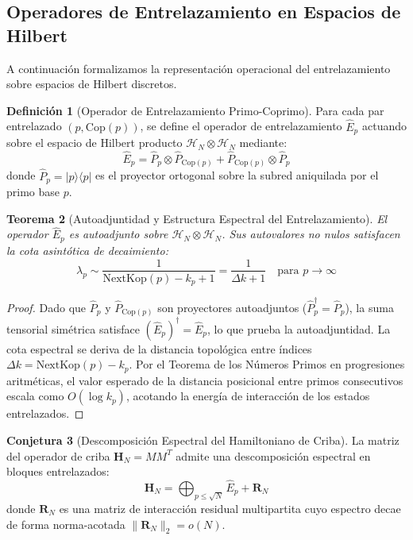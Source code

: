 \documentclass{article}
\numberwithin{equation}{section}
\theoremstyle{plain}
\newtheorem{theorem}{Teorema}[section]
\theoremstyle{definition}
\newtheorem{definition}[theorem]{Definición}
\newtheorem{conjecture}[theorem]{Conjetura}
\begin{document}
\subsection{Operadores de Entrelazamiento en Espacios de Hilbert}

A continuación formalizamos la representación operacional del entrelazamiento sobre espacios de Hilbert discretos.

\begin{definition}[Operador de Entrelazamiento Primo-Coprimo]
\label{def:operador-entrelazamiento}
Para cada par entrelazado $(p, \mathrm{Cop}(p))$, se define el operador de entrelazamiento $\hat{E}_p$ actuando sobre el espacio de Hilbert producto $\mathcal{H}_N \otimes \mathcal{H}_N$ mediante:
\begin{equation}
\hat{E}_p = \hat{P}_p \otimes \hat{P}_{\mathrm{Cop}(p)} + \hat{P}_{\mathrm{Cop}(p)} \otimes \hat{P}_p
\end{equation}
donde $\hat{P}_p = |p\rangle\langle p|$ es el proyector ortogonal sobre la subred aniquilada por el primo base $p$.
\end{definition}

\begin{theorem}[Autoadjuntidad y Estructura Espectral del Entrelazamiento]
\label{thm:espectro-entrelazamiento}
El operador $\hat{E}_p$ es autoadjunto sobre $\mathcal{H}_N \otimes \mathcal{H}_N$. Sus autovalores no nulos satisfacen la cota asintótica de decaimiento:
\begin{equation}
\lambda_p \sim \frac{1}{\mathrm{NextKop}(p) - k_p + 1} = \frac{1}{\Delta k + 1} \quad \text{para } p \to \infty
\end{equation}
\end{theorem}

\begin{proof}
Dado que $\hat{P}_p$ y $\hat{P}_{\mathrm{Cop}(p)}$ son proyectores autoadjuntos ($\hat{P}_p^\dagger = \hat{P}_p$), la suma tensorial simétrica satisface $(\hat{E}_p)^\dagger = \hat{E}_p$, lo que prueba la autoadjuntidad. La cota espectral se deriva de la distancia topológica entre índices $\Delta k = \mathrm{NextKop}(p) - k_p$. Por el Teorema de los Números Primos en progresiones aritméticas, el valor esperado de la distancia posicional entre primos consecutivos escala como $O(\log k_p)$, acotando la energía de interacción de los estados entrelazados.
\end{proof}

\begin{conjecture}[Descomposición Espectral del Hamiltoniano de Criba]
\label{conj:entrelazamiento-matriz}
La matriz del operador de criba $\mathbf{H}_N = M M^T$ admite una descomposición espectral en bloques entrelazados:
\begin{equation}
\mathbf{H}_N = \bigoplus_{p \le \sqrt{N}} \hat{E}_p + \mathbf{R}_N
\end{equation}
donde $\mathbf{R}_N$ es una matriz de interacción residual multipartita cuyo espectro decae de forma norma-acotada $\| \mathbf{R}_N \|_2 = o(N)$.
\end{conjecture}
\end{document}
